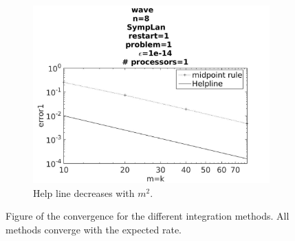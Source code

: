 \begin{figure}[H]
\begin{subfigure}[b]{0.30\textwidth}
        \end{subfigure}
        \begin{subfigure}[b]{0.30\textwidth}
                \includegraphics[width=\textwidth]{../MATLAB/fig/intconvmid.jpg}
                \caption{ Help line decreases with $m^2$. }
                \label{fig:intconvmid}
        \end{subfigure}
        \caption{Figure of the convergence for the different integration methods. All methods converge with the expected rate. }
        \label{fig:intconv}
\end{figure}


